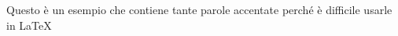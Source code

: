 \documentclass[a4paper,12pt]{article}
\begin{document}
Questo è un esempio che contiene tante parole accentate perché è difficile usarle in \LaTeX
\end{document}
